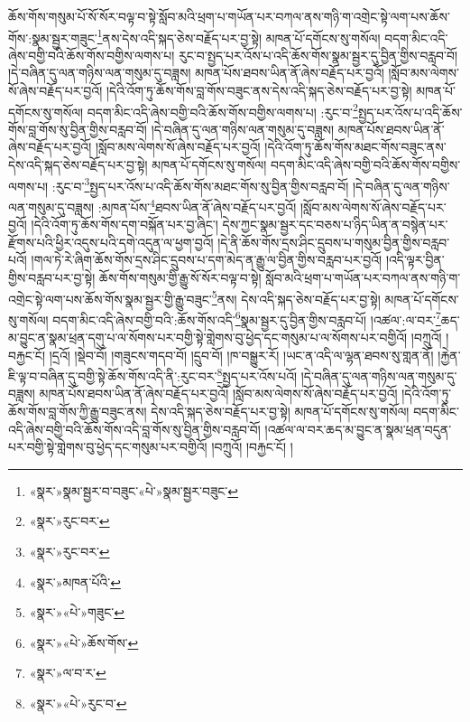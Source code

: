 ཆོས་གོས་གསུམ་པོ་སོ་སོར་བལྟ་བ་སྟེ་སློབ་མའི་ཕྲག་པ་གཡོན་པར་བཀལ་ནས་གཉི་ག་འགྲེང་སྟེ་ལག་པས་ཆོས་གོས་:སྣམ་སྦྱར་གཟུང་\footnote{«སྣར་»སྣམ་སྦྱར་བ་བཟུང་«པེ་»སྣམ་སྦྱར་བཟུང་}ནས་དེས་འདི་སྐད་ཅེས་བརྗོད་པར་བྱ་སྟེ། མཁན་པོ་དགོངས་སུ་གསོལ། བདག་མིང་འདི་ཞེས་བགྱི་བའི་ཆོས་གོས་བགྱིས་ལགས་པ། རུང་བ་སྤྱད་པར་འོས་པ་འདི་ཆོས་གོས་སྣམ་སྦྱར་དུ་བྱིན་གྱིས་བརླབ་བོ། །དེ་བཞིན་དུ་ལན་གཉིས་ལན་གསུམ་དུ་བཟླས། མཁན་པོས་ཐབས་ཡིན་ནོ་ཞེས་བརྗོད་པར་བྱའོ། །སློབ་མས་ལེགས་སོ་ཞེས་བརྗོད་པར་བྱའོ། །དེའི་འོག་ཏུ་ཆོས་གོས་བླ་གོས་བཟུང་ནས་དེས་འདི་སྐད་ཅེས་བརྗོད་པར་བྱ་སྟེ། མཁན་པོ་དགོངས་སུ་གསོལ། བདག་མིང་འདི་ཞེས་བགྱི་བའི་ཆོས་གོས་བགྱིས་ལགས་པ། :རུང་བ་\footnote{«སྣར་»རུང་བར་}སྤྱད་པར་འོས་པ་འདི་ཆོས་གོས་བླ་གོས་སུ་བྱིན་གྱིས་བརླབ་བོ། །དེ་བཞིན་དུ་ལན་གཉིས་ལན་གསུམ་དུ་བཟླས། མཁན་པོས་ཐབས་ཡིན་ནོ་ཞེས་བརྗོད་པར་བྱའོ། །སློབ་མས་ལེགས་སོ་ཞེས་བརྗོད་པར་བྱའོ། །དེའི་འོག་ཏུ་ཆོས་གོས་མཐང་གོས་བཟུང་ནས་དེས་འདི་སྐད་ཅེས་བརྗོད་པར་བྱ་སྟེ། མཁན་པོ་དགོངས་སུ་གསོལ། བདག་མིང་འདི་ཞེས་བགྱི་བའི་ཆོས་གོས་བགྱིས་ལགས་པ། :རུང་བ་\footnote{«སྣར་»རུང་བར་}སྤྱད་པར་འོས་པ་འདི་ཆོས་གོས་མཐང་གོས་སུ་བྱིན་གྱིས་བརླབ་བོ། །དེ་བཞིན་དུ་ལན་གཉིས་ལན་གསུམ་དུ་བཟླས། :མཁན་པོས་\footnote{«སྣར་»མཁན་པོའི་}ཐབས་ཡིན་ནོ་ཞེས་བརྗོད་པར་བྱའོ། །སློབ་མས་ལེགས་སོ་ཞེས་བརྗོད་པར་བྱའོ། །དེའི་འོག་ཏུ་ཆོས་གོས་དག་བསྐོན་པར་བྱ་ཞིང་། དེས་ཀྱང་སྣམ་སྦྱར་དང་བཅས་པ་ཉིད་ཡིན་ན་བསྙེན་པར་རྫོགས་པའི་ཕྱིར་འདུས་པའི་དགེ་འདུན་ལ་ཕྱག་བྱའོ། །དེ་ནི་ཆོས་གོས་དྲས་ཤིང་དྲུབས་པ་གསུམ་བྱིན་གྱིས་བརླབ་པའོ། །གལ་ཏེ་རེ་ཞིག་ཆོས་གོས་དྲས་ཤིང་དྲུབས་པ་དག་མེད་ན་རྒྱུ་ལ་བྱིན་གྱིས་བརླབ་པར་བྱའོ། །འདི་ལྟར་བྱིན་གྱིས་བརླབ་པར་བྱ་སྟེ། ཆོས་གོས་གསུམ་གྱི་རྒྱུ་སོ་སོར་བལྟ་བ་སྟེ། སློབ་མའི་ཕྲག་པ་གཡོན་པར་བཀལ་ནས་གཉི་ག་འགྲེང་སྟེ་ལག་པས་ཆོས་གོས་སྣམ་སྦྱར་གྱི་རྒྱུ་བཟུང་\footnote{«སྣར་»«པེ་»གཟུང་}ནས། དེས་འདི་སྐད་ཅེས་བརྗོད་པར་བྱ་སྟེ། མཁན་པོ་དགོངས་སུ་གསོལ། བདག་མིང་འདི་ཞེས་བགྱི་བའི་:ཆོས་གོས་འདི་\footnote{«སྣར་»«པེ་»ཆོས་གོས་}སྣམ་སྦྱར་དུ་བྱིན་གྱིས་བརླབ་པོ། །འཚལ་:ལ་བར་\footnote{«སྣར་»ལ་བ་ར་}ཆད་མ་བྱུང་ན་སྣམ་ཕྲན་དགུ་པ་ལ་སོགས་པར་བགྱི་སྟེ་གླེགས་བུ་ཕྱེད་དང་གསུམ་པ་ལ་སོགས་པར་བགྱིའོ། །བཀྲུའོ། །བརྐྱང་ངོ། །དྲའོ། །སྡེབ་བོ། །གཟུངས་གདབ་བོ། །དྲུབ་བོ། །ཁ་བསྒྱུར་རོ། །ཡང་ན་འདི་ལ་ལྷན་ཐབས་སུ་གླན་ནོ། །རྐྱེན་ཇི་ལྟ་བ་བཞིན་དུ་བགྱི་སྟེ་ཆོས་གོས་འདི་ནི་:རུང་བར་\footnote{«སྣར་»«པེ་»རུང་བ་}སྤྱད་པར་འོས་པའོ། །དེ་བཞིན་དུ་ལན་གཉིས་ལན་གསུམ་དུ་བཟླས། མཁན་པོས་ཐབས་ཡིན་ནོ་ཞེས་བརྗོད་པར་བྱའོ། །སློབ་མས་ལེགས་སོ་ཞེས་བརྗོད་པར་བྱའོ། །དེའི་འོག་ཏུ་ཆོས་གོས་བླ་གོས་ཀྱི་རྒྱུ་བཟུང་ནས། དེས་འདི་སྐད་ཅེས་བརྗོད་པར་བྱ་སྟེ། མཁན་པོ་དགོངས་སུ་གསོལ། བདག་མིང་འདི་ཞེས་བགྱི་བའི་ཆོས་གོས་འདི་བླ་གོས་སུ་བྱིན་གྱིས་བརླབ་བོ། །འཚལ་ལ་བར་ཆད་མ་བྱུང་ན་སྣམ་ཕྲན་བདུན་པར་བགྱི་སྟེ་གླེགས་བུ་ཕྱེད་དང་གསུམ་པར་བགྱིའོ། །བཀྲུའོ། །བརྐྱང་ངོ། །
